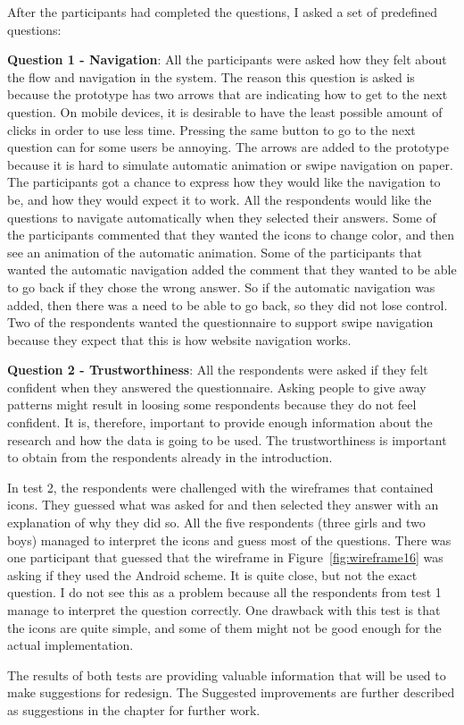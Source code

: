   After the participants had completed the questions, I asked a set of predefined questions:

  {\bf Question 1 - Navigation}: All the participants were asked how they felt about the flow and navigation in the system. The reason this question is asked is because the prototype has two arrows that are indicating how to get to the next question. On mobile devices, it is desirable to have the least possible amount of clicks in order to use less time. Pressing the same button to go to the next question can for some users be annoying. The arrows are added to the prototype because it is hard to simulate automatic animation or swipe navigation on paper. The participants got a chance to express how they would like the navigation to be, and how they would expect it to work. All the respondents would like the questions to navigate automatically when they selected their answers. Some of the participants commented that they wanted the icons to change color, and then see an animation of the automatic animation. Some of the participants that wanted the automatic navigation added the comment that they wanted to be able to go back if they chose the wrong answer. So if the automatic navigation was added, then there was a need to be able to go back, so they did not lose control. Two of the respondents wanted the questionnaire to support swipe navigation because they expect that this is how website navigation works.

  {\bf Question 2 - Trustworthiness}: All the respondents were asked if they felt confident when they answered the questionnaire. Asking people to give away patterns might result in loosing some respondents because they do not feel confident. It is, therefore, important to provide enough information about the research and how the data is going to be used. The trustworthiness is important to obtain from the respondents already in the introduction.

  In test 2, the respondents were challenged with the wireframes that contained icons. They guessed what was asked for and then selected they answer with an explanation of why they did so. All the five respondents (three girls and two boys) managed to interpret the icons and guess most of the questions. There was one participant that guessed that the wireframe in Figure~\ref{fig:wireframe16} was asking if they used the Android scheme. It is quite close, but not the exact question. I do not see this as a problem because all the respondents from test 1 manage to interpret the question correctly. One drawback with this test is that the icons are quite simple, and some of them might not be good enough for the actual implementation.

  The results of both tests are providing valuable information that will be used to make suggestions for redesign. The Suggested improvements are further described as suggestions in the chapter for further work.
  